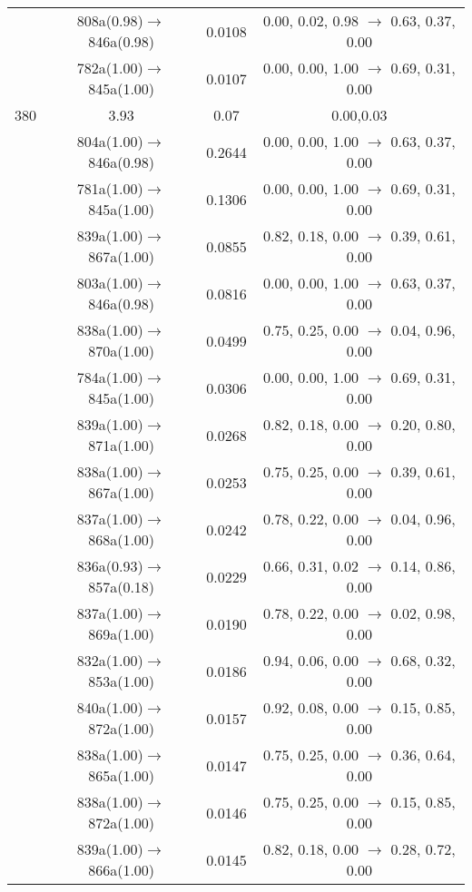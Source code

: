 \documentclass[10pt,a4paper]{article}
\begin{document}
\begin{longtable}{c|c|c|c}
 	& 808a(0.98)$\rightarrow$846a(0.98) &	 0.0108 &	 0.00, 0.02, 0.98 $\rightarrow$ 0.63, 0.37, 0.00 \\ 
 	& 782a(1.00)$\rightarrow$845a(1.00) &	 0.0107 &	 0.00, 0.00, 1.00 $\rightarrow$ 0.69, 0.31, 0.00 \\ 
 \hline380 &	 3.93 &	 0.07 &	 0.00,0.03 \\ 
  	& 804a(1.00)$\rightarrow$846a(0.98) &	 0.2644 &	 0.00, 0.00, 1.00 $\rightarrow$ 0.63, 0.37, 0.00 \\ 
 	& 781a(1.00)$\rightarrow$845a(1.00) &	 0.1306 &	 0.00, 0.00, 1.00 $\rightarrow$ 0.69, 0.31, 0.00 \\ 
 	& 839a(1.00)$\rightarrow$867a(1.00) &	 0.0855 &	 0.82, 0.18, 0.00 $\rightarrow$ 0.39, 0.61, 0.00 \\ 
 	& 803a(1.00)$\rightarrow$846a(0.98) &	 0.0816 &	 0.00, 0.00, 1.00 $\rightarrow$ 0.63, 0.37, 0.00 \\ 
 	& 838a(1.00)$\rightarrow$870a(1.00) &	 0.0499 &	 0.75, 0.25, 0.00 $\rightarrow$ 0.04, 0.96, 0.00 \\ 
 	& 784a(1.00)$\rightarrow$845a(1.00) &	 0.0306 &	 0.00, 0.00, 1.00 $\rightarrow$ 0.69, 0.31, 0.00 \\ 
 	& 839a(1.00)$\rightarrow$871a(1.00) &	 0.0268 &	 0.82, 0.18, 0.00 $\rightarrow$ 0.20, 0.80, 0.00 \\ 
 	& 838a(1.00)$\rightarrow$867a(1.00) &	 0.0253 &	 0.75, 0.25, 0.00 $\rightarrow$ 0.39, 0.61, 0.00 \\ 
 	& 837a(1.00)$\rightarrow$868a(1.00) &	 0.0242 &	 0.78, 0.22, 0.00 $\rightarrow$ 0.04, 0.96, 0.00 \\ 
 	& 836a(0.93)$\rightarrow$857a(0.18) &	 0.0229 &	 0.66, 0.31, 0.02 $\rightarrow$ 0.14, 0.86, 0.00 \\ 
 	& 837a(1.00)$\rightarrow$869a(1.00) &	 0.0190 &	 0.78, 0.22, 0.00 $\rightarrow$ 0.02, 0.98, 0.00 \\ 
 	& 832a(1.00)$\rightarrow$853a(1.00) &	 0.0186 &	 0.94, 0.06, 0.00 $\rightarrow$ 0.68, 0.32, 0.00 \\ 
 	& 840a(1.00)$\rightarrow$872a(1.00) &	 0.0157 &	 0.92, 0.08, 0.00 $\rightarrow$ 0.15, 0.85, 0.00 \\ 
 	& 838a(1.00)$\rightarrow$865a(1.00) &	 0.0147 &	 0.75, 0.25, 0.00 $\rightarrow$ 0.36, 0.64, 0.00 \\ 
 	& 838a(1.00)$\rightarrow$872a(1.00) &	 0.0146 &	 0.75, 0.25, 0.00 $\rightarrow$ 0.15, 0.85, 0.00 \\ 
 	& 839a(1.00)$\rightarrow$866a(1.00) &	 0.0145 &	 0.82, 0.18, 0.00 $\rightarrow$ 0.28, 0.72, 0.00 \\ 

\end{longtable}
\end{document}
